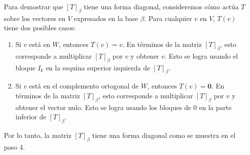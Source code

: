 Para demostrar que $[T]_{\beta}$ tiene una forma diagonal, consideremos cómo actúa $T$ sobre los vectores en $V$ expresados en la base $\beta$. Para cualquier $v$ en $V$, $T(v)$ tiene dos posibles casos:

\begin{enumerate}
    \item Si $v$ está en $W$, entonces $T(v) = v$. En términos de la matriz $[T]_{\beta}$, esto corresponde a multiplicar $[T]_{\beta}$ por $v$ y obtener $v$. Esto se logra usando el bloque $I_k$ en la esquina superior izquierda de $[T]_{\beta}$.

    \item Si $v$ está en el complemento ortogonal de $W$, entonces $T(v) = \mathbf{0}$. En términos de la matriz $[T]_{\beta}$, esto corresponde a multiplicar $[T]_{\beta}$ por $v$ y obtener el vector nulo. Esto se logra usando los bloques de $0$ en la parte inferior de $[T]_{\beta}$.

\end{enumerate}

Por lo tanto, la matriz $[T]_{\beta}$ tiene una forma diagonal como se muestra en el paso 4.



